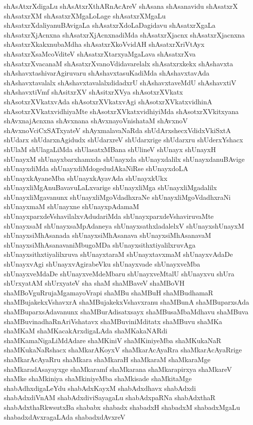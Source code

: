 {shAsAtxrXdigaLu
shAsAtxrXthARnAcAreV
shAsana
shAsanavidu
shAsatxrX
shAsatxrXM
shAsatxrXMgaLoLage
shAsatxrXMgaLu
shAsatxrXdaliyanuBAvigaLa
shAsatxrXdoLaDagidavu
shAsatxrXgaLa
shAsatxrXjAcnxna
shAsatxrXjAcnxnadiMda
shAsatxrXjacnx
shAsatxrXjacnxna
shAsatxrXkakxnubaMdha
shAsatxrXkoVvidAH
shAsatxrXriVtAyx
shAsatxrXsaMcoVditeV
shAsatxrXtarxyaMgaLava
shAsatxrXva
shAsatxrXvacanaM
shAsatxrXvanoVdidavarelalx
shAsatxrxkekx
shAshavxta
shAshavxtashivarAgiruvaru
shAshavxtasuKadiMda
shAshavxtavAda
shAshavxtavalalx
shAshavxtavalalxdidadxrU
shAshavxtaveMdU
shAshavxtiV
shAshavxtiVmf
shAsitxrXV
shAsitxrXVya
shAsotxrXVkatx
shAsotxrXVkatxvAda
shAsotxrXVkatxvAgi
shAsotxrXVkatxvidhinA
shAsotxrXVkatxvidhiyaMte
shAsotxrXVkatxvidhiyiMda
shAsotxrXVkitxyana
shAvxnajAcnxna
shAvxnana
shAvxnayoVnishataM
shAvxnoV
shAvxnoVciCxSATxyateV
shAyxmalavaNaRda
shUdArxshecxVdidxVkiSxtA
shUdarx
shUdarxnAgidudx
shUdarxreV
shUdarxrige
shUdarxru
shUderxYshacx
shUlaM
shUlagaLiMda
shUlasatxMBana
shUlineV
shUnayx
shUnayxH
shUnayxM
shUnayxbarxhamxda
shUnayxda
shUnayxdalilx
shUnayxdanuBAvige
shUnayxdiMda
shUnayxdiMdogedudAkaNiRse
shUnayxdoLA
shUnayxkAyaneMba
shUnayxkAyavAda
shUnayxkUkx
shUnayxliMgAnuBavavuLaLxvarige
shUnayxliMga
shUnayxliMgadalilx
shUnayxliMgavanunx
shUnayxliMgoVdadhxraNe
shUnayxliMgoVdadhxraNi
shUnayxmaM
shUnayxne
shUnayxpAdamaM
shUnayxparxdeVshavilalxvAdudariMda
shUnayxparxdeVshaviruvaMte
shUnayxsaM
shUnayxsaMpAdaneya
shUnayxsathxladalelxV
shUnayxshUnayxM
shUnayxsiMhAsanada
shUnayxsiMhAsanava
shUnayxsiMhAsanavaM
shUnayxsiMhAsanavaniMbugoMDa
shUnayxsithxtiyalilxruvAga
shUnayxsithxtiyalilxruva
shUnayxtaraM
shUnayxtavxmaM
shUnayxvAdaDe
shUnayxvAgi
shUnayxvAgirabeVku
shUnayxvade
shUnayxveMba
shUnayxveMdaDe
shUnayxveMdeMbaru
shUnayxveMtalU
shUnayxvu
shUra
shUrxyatAM
shUrxyateV
sha
shaM
shaMBaveV
shaMBoVH
shaMBoVguRrujaMgamayoVrapi
shaMBu
shaMBuH
shaMBudhamaR
shaMBujakekxVshavxrA
shaMBujakekxVshavxranu
shaMBunA
shaMBuparxsAda
shaMBuparxsAdavanunx
shaMBurAdisatxsayx
shaMBusaMbaMdhavu
shaMBuva
shaMBuvinadhaRnAriVshatavx
shaMBuviniMditatx
shaMBuvu
shaMKa
shaMKaM
shaMKacakArxdigaLAda
shaMKakaNARdi
shaMKamaNigaLiMdAdare
shaMKiniV
shaMKiniyeMba
shaMKukaNaR
shaMKukaNaRshacx
shaMkarAKoyxV
shaMkarAcAyaRra
shaMkarAcAyaRrige
shaMkarAcAyaRru
shaMkara
shaMkaraH
shaMkaraM
shaMkaraMge
shaMkaradAsayayxge
shaMkaramf
shaMkarana
shaMkarapirxya
shaMkareV
shaMke
shaMkiniya
shaMkiniyeMba
shaMkisade
shaMkitaMge
shabAdhxdigaLeYdu
shabAdxKayxM
shabAdxdhavx
shabAdxdi
shabAdxdiVnAM
shabAdxdiviSayagaLu
shabAdxpaRNa
shabAdxthaR
shabAdxthaRkwsutxBa
shababx
shabadx
shabadxH
shabadxM
shabadxMgaLu
shabadxdAvxragaLAda
shabadxdAvxreV
}
